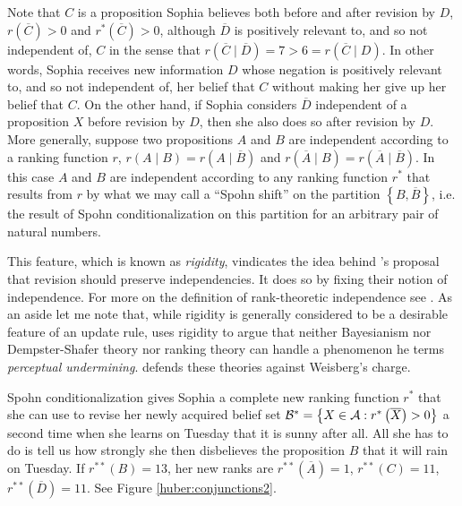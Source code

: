 Note that $C$ is a proposition Sophia believes both before and after revision by $D$, $r\left(\overline{C}\right)>0$ and $r^*\left(\overline{C}\right)>0$, although $\overline{D}$ is positively relevant to, and so not independent of, $C$ in the sense that $r\left(\overline{C}\mid\overline{D}\right)=7>6=r\left(\overline{C}\mid D\right)$. In other words, Sophia receives new information $D$ whose negation is positively relevant to, and so not independent of, her belief that $C$ without making her give up her belief that $C$. On the other hand, if Sophia considers $\overline{D}$ independent of a proposition $X$ before revision by $D$, %
then she also does so after revision by $D$. %
More generally, suppose two propositions $A$ and $B$ are independent according to a ranking function $r$, $r\left(A\mid B\right)=r\left(A\mid\overline{B}\right)$ and $r\left(\overline{A}\mid B\right)=r\left(\overline{A}\mid\overline{B}\right)$. In this case $A$ and $B$ are independent according to any ranking function $r^*$ that results from $r$ by what we may call a ``Spohn shift'' on the partition $\left\{B,\overline{B}\right\}$, i.e. the result of Spohn conditionalization on this partition for an arbitrary pair of natural numbers.

This feature, which is known as \emph{rigidity}, vindicates the idea behind \citet{jt07}'s proposal that revision should preserve independencies. It does so by fixing their notion of independence. For more on the definition of rank-theoretic independence see \citet{s99}. As an aside let me note that, while rigidity is generally considered to be a desirable feature of an update rule, \citet{w09, w15} uses rigidity to argue that neither Bayesianism nor Dempster-Shafer theory \citep{h09} nor ranking theory can handle a phenomenon he terms \emph{perceptual undermining}. \citet{h14a} defends these theories against Weisberg's charge.

Spohn conditionalization gives Sophia a complete new ranking function $r^*$ that she can use to revise her newly acquired belief set $\begin{cal}B\end{cal}^*=\left\{X\in\begin{cal}A\end{cal}: r^*\left(\overline{X}\right)>0\right\}$ a second time when she learns on Tuesday that it is sunny after all. All she has to do is tell us how strongly she then disbelieves the proposition $B$ that it will rain on Tuesday. If $r^{**}\left(B\right)=13$, her new ranks are $r^{**}\left(\overline{A}\right)=1$, $r^{**}\left(C\right)=11$, $r^{**}\left(\overline{D}\right)=11$. See Figure \ref{huber:conjunctions2}.


